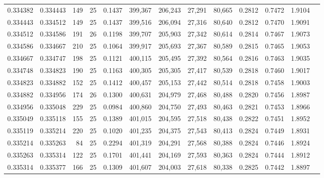 \begin{tabular}{rrrrrrrrrrrrr}
0.334382 & 0.334443 &   149 &  25 &                                     0.1437 & 399,367 & 206,243 &  27,291 &  80,665 & 0.2812 & 0.7472 & 1.9104 \\
0.334443 & 0.334512 &   149 &  25 &                                     0.1437 & 399,516 & 206,094 &  27,316 &  80,640 & 0.2812 & 0.7470 & 1.9091 \\
0.334512 & 0.334586 &   191 &  26 &                                     0.1198 & 399,707 & 205,903 &  27,342 &  80,614 & 0.2814 & 0.7467 & 1.9073 \\
0.334586 & 0.334667 &   210 &  25 &                                     0.1064 & 399,917 & 205,693 &  27,367 &  80,589 & 0.2815 & 0.7465 & 1.9053 \\
0.334667 & 0.334747 &   198 &  25 &                                     0.1121 & 400,115 & 205,495 &  27,392 &  80,564 & 0.2816 & 0.7463 & 1.9035 \\
0.334748 & 0.334823 &   190 &  25 &                                     0.1163 & 400,305 & 205,305 &  27,417 &  80,539 & 0.2818 & 0.7460 & 1.9017 \\
0.334823 & 0.334882 &   152 &  25 &                                     0.1412 & 400,457 & 205,153 &  27,442 &  80,514 & 0.2818 & 0.7458 & 1.9003 \\
0.334882 & 0.334956 &   174 &  26 &                                     0.1300 & 400,631 & 204,979 &  27,468 &  80,488 & 0.2820 & 0.7456 & 1.8987 \\
0.334956 & 0.335048 &   229 &  25 &                                     0.0984 & 400,860 & 204,750 &  27,493 &  80,463 & 0.2821 & 0.7453 & 1.8966 \\
0.335049 & 0.335118 &   155 &  25 &                                     0.1389 & 401,015 & 204,595 &  27,518 &  80,438 & 0.2822 & 0.7451 & 1.8952 \\
0.335119 & 0.335214 &   220 &  25 &                                     0.1020 & 401,235 & 204,375 &  27,543 &  80,413 & 0.2824 & 0.7449 & 1.8931 \\
0.335214 & 0.335263 &    84 &  25 &                                     0.2294 & 401,319 & 204,291 &  27,568 &  80,388 & 0.2824 & 0.7446 & 1.8924 \\
0.335263 & 0.335314 &   122 &  25 &                                     0.1701 & 401,441 & 204,169 &  27,593 &  80,363 & 0.2824 & 0.7444 & 1.8912 \\
0.335314 & 0.335377 &   166 &  25 &                                     0.1309 & 401,607 & 204,003 &  27,618 &  80,338 & 0.2825 & 0.7442 & 1.8897 \\

\end{tabular}
